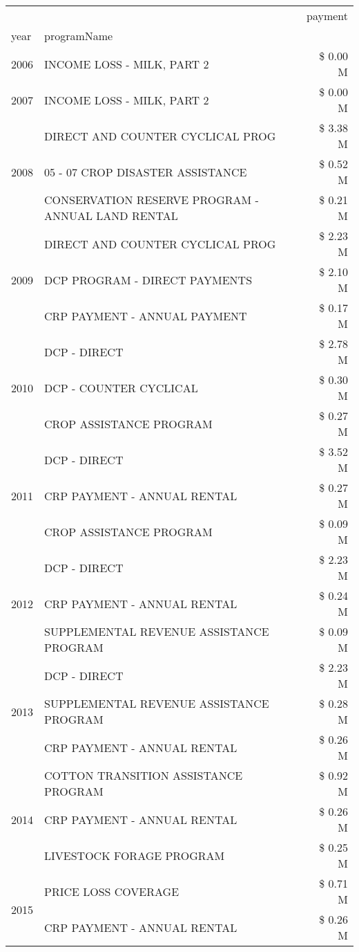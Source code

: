 \begin{tabular}{llr}
\toprule
 &  & payment \\
year & programName &  \\
\midrule
2006 & INCOME LOSS - MILK, PART 2 & \$ 0.00 M \\
\cline{1-3}
2007 & INCOME LOSS - MILK, PART 2 & \$ 0.00 M \\
\cline{1-3}
\multirow[t]{3}{*}{2008} & DIRECT AND COUNTER CYCLICAL PROG & \$ 3.38 M \\
 & 05 - 07 CROP DISASTER ASSISTANCE & \$ 0.52 M \\
 & CONSERVATION RESERVE PROGRAM - ANNUAL LAND RENTAL & \$ 0.21 M \\
\cline{1-3}
\multirow[t]{3}{*}{2009} & DIRECT AND COUNTER CYCLICAL PROG & \$ 2.23 M \\
 & DCP PROGRAM - DIRECT PAYMENTS & \$ 2.10 M \\
 & CRP PAYMENT - ANNUAL PAYMENT & \$ 0.17 M \\
\cline{1-3}
\multirow[t]{3}{*}{2010} & DCP - DIRECT & \$ 2.78 M \\
 & DCP - COUNTER CYCLICAL & \$ 0.30 M \\
 & CROP ASSISTANCE PROGRAM & \$ 0.27 M \\
\cline{1-3}
\multirow[t]{3}{*}{2011} & DCP - DIRECT & \$ 3.52 M \\
 & CRP PAYMENT - ANNUAL RENTAL & \$ 0.27 M \\
 & CROP ASSISTANCE PROGRAM & \$ 0.09 M \\
\cline{1-3}
\multirow[t]{3}{*}{2012} & DCP - DIRECT & \$ 2.23 M \\
 & CRP PAYMENT - ANNUAL RENTAL & \$ 0.24 M \\
 & SUPPLEMENTAL REVENUE ASSISTANCE PROGRAM & \$ 0.09 M \\
\cline{1-3}
\multirow[t]{3}{*}{2013} & DCP - DIRECT & \$ 2.23 M \\
 & SUPPLEMENTAL REVENUE ASSISTANCE PROGRAM & \$ 0.28 M \\
 & CRP PAYMENT - ANNUAL RENTAL & \$ 0.26 M \\
\cline{1-3}
\multirow[t]{3}{*}{2014} & COTTON TRANSITION ASSISTANCE PROGRAM & \$ 0.92 M \\
 & CRP PAYMENT - ANNUAL RENTAL & \$ 0.26 M \\
 & LIVESTOCK FORAGE PROGRAM & \$ 0.25 M \\
\cline{1-3}
\multirow[t]{3}{*}{2015} & PRICE LOSS COVERAGE & \$ 0.71 M \\
 & CRP PAYMENT - ANNUAL RENTAL & \$ 0.26 M \\

\end{tabular}
